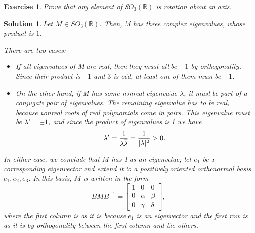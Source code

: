 \documentclass{article}
\newtheorem{ex}{Exercise}
\theoremstyle{nonumberplain}
\newtheorem{sol}{Solution}
\newcommand{\R}{\mathbb{R}}
\newcommand{\conj}[1]{\overline{#1}}
\DeclarePairedDelimiter{\abs}{\lvert}{\rvert}
\begin{document}
\begin{ex}
Prove that any element of $SO_3(\R)$ is rotation about an axis.
\end{ex}

\begin{sol}
Let $M \in SO_3(\R)$. Then, $M$ has three complex eigenvalues, whose product is $1$.

There are two cases:
\begin{itemize}
\item If all eigenvalues of $M$ are real, then they must all be $\pm 1$ by orthogonality. Since their product is $+1$ and $3$ is odd, at least one of them must be $+1$.
\item On the other hand, if $M$ has some nonreal eigenvalue $\lambda$, it must be part of a conjugate pair of eigenvalues. The remaining eigenvalue has to be real, because nonreal roots of real polynomials come in pairs. This eigenvalue must be $\lambda' = \pm 1$, and since the product of eigenvalues is 1 we have
\begin{equation}
\lambda' = \frac1{\lambda \conj \lambda} = \frac1{\abs{\lambda}^2} > 0.
\end{equation}
\end{itemize}

In either case, we conclude that $M$ has 1 as an eigenvalue; let $e_1$ be a corresponding eigenvector and extend it to a positively oriented orthonormal basis $e_1, e_2, e_3$. In this basis, $M$ is written in the form
\begin{equation}
BMB^{-1} =
\begin{bmatrix}
1 & 0 & 0\\
0 & \alpha & \beta\\
0 & \gamma & \delta
\end{bmatrix},
\end{equation}
where the first column is as it is because $e_1$ is an eigenvector and the first row is as it is by orthogonality between the first column and the others.


\end{sol}
\end{document}
